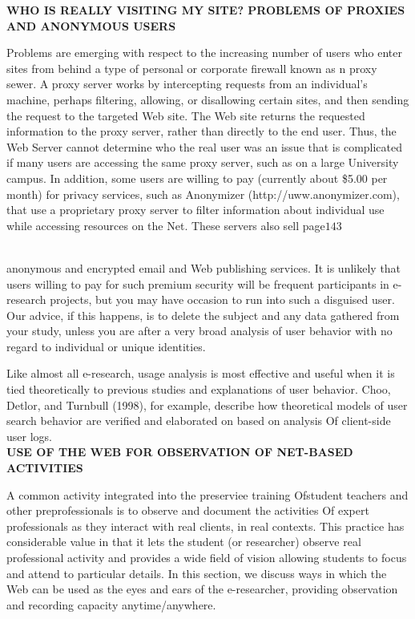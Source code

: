 \documentclass{book}
\begin{document}
\textbf{WHO IS REALLY VISITING MY SITE? PROBLEMS OF PROXIES AND ANONYMOUS USERS}\par  Problems are emerging with respect to the increasing number of users who enter sites from behind a type of personal or corporate firewall known as n proxy sewer. A proxy server works by intercepting requests from an individual's machine, perhaps filtering, allowing, or disallowing certain sites, and then sending the request to the targeted Web site. The Web site returns the requested information to the proxy server, rather than directly to the end user. Thus, the Web Server cannot determine who the real user was an issue that is complicated if many users are accessing the same proxy server, such as on a large University campus. In addition, some users are willing to pay (currently about \$5.00 per month) for privacy services, such as Anonymizer (http://uww.anonymizer.com), that use a proprietary proxy server to filter information about individual use while accessing resources on the Net. These servers also sell\newpage
page$143$\\\\\par
anonymous and encrypted email and Web publishing services. It is unlikely that users willing to pay for such premium security will be frequent participants in e-research projects, but you may have occasion to run into such a disguised user. Our advice, if this happens, is to delete the subject and any data gathered from your study, unless you are after a very broad analysis of user behavior with no regard to individual or unique identities.\par 
Like almost all e-research, usage analysis is most effective and useful when it is tied theoretically to previous studies and explanations of user behavior. Choo, Detlor, and Turnbull (1998), for example, describe how theoretical models of user search behavior are verified and elaborated on based on analysis Of client-side user logs.\\
\textbf{USE OF THE WEB FOR OBSERVATION OF NET-BASED ACTIVITIES}\par 
 A common activity integrated into the preserviee training Ofstudent teachers and other preprofessionals is to observe and document the activities Of expert professionals as they interact with real clients, in real contexts. This practice has considerable value in that it lets the student (or researcher) observe real professional activity and provides a wide field of vision allowing students to focus and attend to particular details. In this section, we discuss ways in which the Web can be used as the eyes and ears of the e-researcher, providing observation and recording capacity anytime/anywhere.\par 
\end{document}
